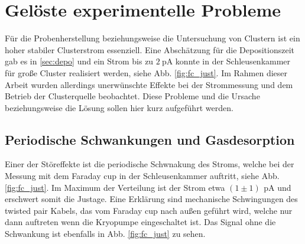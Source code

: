 \section{Gelöste experimentelle Probleme}
\label{sec:effekte}
Für die Probenherstellung beziehungsweise die Untersuchung von Clustern ist ein hoher stabiler Clusterstrom essenziell.
Eine Abschätzung für die Depositionszeit gab es in \ref{sec:depo} und ein Strom bis zu $\SI{2}{\pA}$ konnte in der Schleusenkammer für große Cluster realisiert werden, siehe Abb. \ref{fig:fc_just}.
Im Rahmen dieser Arbeit wurden allerdings unerwünschte Effekte bei der Strommessung und dem Betrieb der Clusterquelle beobachtet.
Diese Probleme und die Ursache beziehungsweise die Lösung sollen hier kurz aufgeführt werden.

\subsection{Periodische Schwankungen und Gasdesorption}
Einer der Störeffekte ist die periodische Schwnakung des Stroms, welche bei der Messung mit dem Faraday cup in der Schleusenkammer auftritt, siehe Abb. \ref{fig:fc_just}.
Im Maximum der Verteilung ist der Strom etwa $(1\pm 1)\,\SI{}{\pA}$ und erschwert somit die Justage.
Eine Erklärung sind mechanische Schwingungen des twisted pair Kabels, das vom Faraday cup nach außen geführt wird, welche nur dann auftreten wenn die Kryopumpe eingeschaltet ist.
Das Signal ohne die Schwankung ist ebenfalls in Abb. \ref{fig:fc_just} zu sehen.\\

